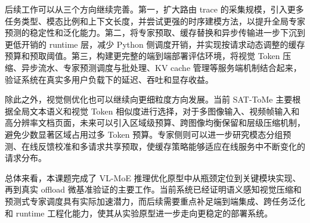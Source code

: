 \begin{conclusion}
后续工作可以从三个方向继续完善。第一，扩大路由 trace 的采集规模，引入更多任务类型、模态比例和上下文长度，并尝试更强的时序建模方法，以提升全局专家预测的稳定性和泛化能力。第二，将专家预取、缓存替换和异步传输进一步下沉到更低开销的 runtime 层，减少 Python 侧调度开销，并实现按请求动态调整的缓存预算和预取阈值。第三，构建更完整的端到端部署评估环境，将视觉 Token 压缩、异步流水、专家预测调度与批处理、KV cache 管理等服务端机制结合起来，验证系统在真实多用户负载下的延迟、吞吐和显存收益。

除此之外，视觉侧优化也可以继续向更细粒度方向发展。当前 SAT-ToMe 主要根据全局文本语义和视觉 Token 相似度进行选择，对于多图像输入、视频帧输入和高分辨率文档页面，未来可以引入区域级预算、跨图像均衡保留和层级压缩机制，避免少数显著区域占用过多 Token 预算。专家侧则可以进一步研究模态分组预测、在线反馈校准和多请求共享预取，使缓存策略能够适应在线服务中不断变化的请求分布。

总体来看，本课题完成了 VL-MoE 推理优化原型中从瓶颈定位到关键模块实现、再到真实 offload 微基准验证的主要工作。当前系统已经证明语义感知视觉压缩和预测式专家调度具有实际加速潜力，而后续需要重点补足端到端集成、跨任务泛化和 runtime 工程化能力，使其从实验原型进一步走向更稳定的部署系统。
\end{conclusion}
